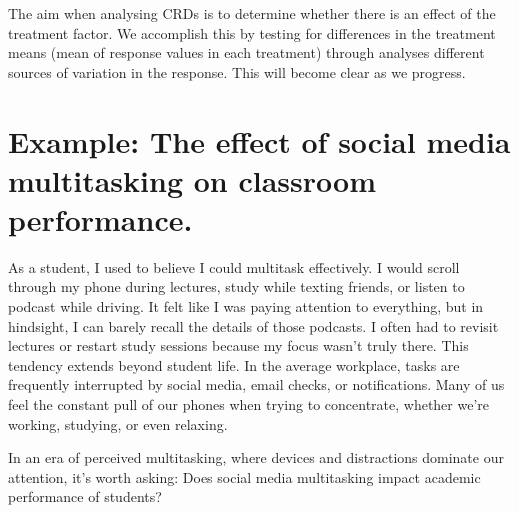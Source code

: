 \documentclass[
  letterpaper,
]{book}
\begin{document}
The aim when analysing CRDs is to determine whether there is an effect
of the treatment factor. We accomplish this by testing for differences
in the treatment means (mean of response values in each treatment)
through analyses different sources of variation in the response. This
will become clear as we progress.

\section{Example: The effect of social media multitasking on classroom
performance.}\label{example-the-effect-of-social-media-multitasking-on-classroom-performance.}

As a student, I used to believe I could multitask effectively. I would
scroll through my phone during lectures, study while texting friends, or
listen to podcast while driving. It felt like I was paying attention to
everything, but in hindsight, I can barely recall the details of those
podcasts. I often had to revisit lectures or restart study sessions
because my focus wasn't truly there. This tendency extends beyond
student life. In the average workplace, tasks are frequently interrupted
by social media, email checks, or notifications. Many of us feel the
constant pull of our phones when trying to concentrate, whether we're
working, studying, or even relaxing.

In an era of perceived multitasking, where devices and distractions
dominate our attention, it's worth asking: Does social media
multitasking impact academic performance of students?
\end{document}
